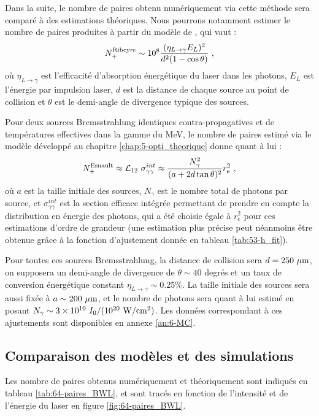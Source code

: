 \begin{refsection}
Dans la suite, le nombre de paires obtenu numériquement via cette méthode sera comparé à des estimations théoriques. Nous pourrons notamment estimer le nombre de paires produites à partir du modèle de \cite{ribeyre_2016}, qui vaut :
\begin{equation}
    N_+^{\textrm{Ribeyre}} \sim 10^8 \dfrac{(\eta_{L \to \gamma} E_L)^2}{d^2 (1-\cos\theta)} ~ \rm ,
    \label{eq:64-N+_Ribeyre}
\end{equation}
où $\eta_{L\to \gamma}$ est l'efficacité d'absorption énergétique du laser dans les photons, $E_L$ est l'énergie par impulsion laser, $d$ est la distance de chaque source au point de collision et $\theta$ est le demi-angle de divergence typique des sources.

Pour deux sources Bremsstrahlung identiques contra-propagatives et de températures effectives dans la gamme du MeV, le nombre de paires estimé via le modèle développé au chapitre \ref{chap:5-opti_theorique} donne quant à lui :
\begin{equation}
    N_+^{\textrm{Esnault}} \approx \mathcal{L}_{12} ~ \sigma_{\gamma\gamma}^{int} \approx \dfrac{N_\gamma^2}{(a+2 d \tan \theta)^2} r_e^2 ~ \rm ,
    \label{eq:64-N+_chap5}
\end{equation}
où $a$ est la taille initiale des sources, $N_\gamma$ est le nombre total de photons par source, et $\sigma_{\gamma\gamma}^{int}$ est la section efficace intégrée permettant de prendre en compte la distribution en énergie des photons, qui a été choisie égale à $r_e^2$ pour ces estimations d'ordre de grandeur (une estimation plus précise peut néanmoins être obtenue grâce à la fonction d'ajustement donnée en tableau \ref{tab:53-h_fit}).

Pour toutes ces sources Bremsstrahlung, la distance de collision sera $d=250 ~ \rm \mu m$, on supposera un demi-angle de divergence de $\theta \sim 40$ degrés et un taux de conversion énergétique constant $\eta_{L \to \gamma} \sim 0.25 \%$. La taille initiale des sources sera aussi fixée à $a \sim 200 ~ \rm \mu m$, et le nombre de photons sera quant à lui estimé en posant $N_\gamma \sim 3 \times 10^{10} ~ I_0/(10^{20} ~ \rm{W/cm^2})$. Les données correspondant à ces ajustements sont disponibles en annexe \ref{an:6-MC}.

\subsection{Comparaison des modèles et des simulations}

Les nombre de paires obtenus numériquement et théoriquement sont indiqués en tableau \ref{tab:64-paires_BWL}, et sont tracés en fonction de l'intensité et de l'énergie du laser en figure \ref{fig:64-paires_BWL}.


\end{refsection}
